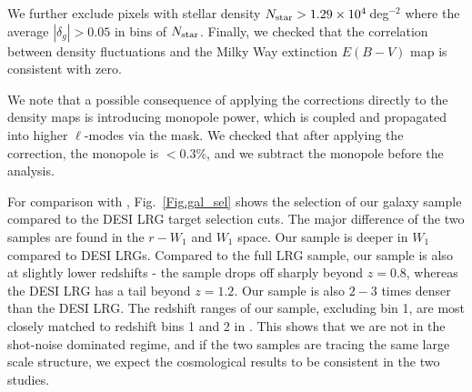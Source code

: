 \documentclass[twocolumn]{aastex631}
\newcommand{\Ellen}[1]{\textcolor{orange}{(QH: #1)}}
\newcommand{\GSF}[1]{\textcolor{green}{(GSF: #1)}}
\begin{document}
{We further exclude pixels with stellar density $N_{\rm star}>1.29\times10^4$\,deg$^{-2}$ where the average $|\delta_g|>0.05$ in bins of $N_{\rm star}$.
Finally, we checked that the correlation between density fluctuations and the Milky Way extinction $E(B-V)$ map \citep{2018JOSS....3..695M} is consistent with zero.


We note that a possible consequence of applying the corrections directly to the density maps is introducing monopole power, which is coupled and propagated into higher $\ell$-modes via the mask. We checked that after applying the correction, the monopole is $< 0.3\%$, and we subtract the monopole before the analysis. 


{For comparison with \cite{Sailer2024}, Fig.~\ref{Fig.gal_sel} shows the selection of our galaxy sample compared to the DESI LRG target selection cuts. The major difference of the two samples are found in the $r-W_1$ and $W_1$ space. Our sample is deeper in $W_1$ compared to DESI LRGs. Compared to the full LRG sample, our sample is also at slightly lower redshifts - the sample drops off sharply beyond $z=0.8$, whereas the DESI LRG has a tail beyond $z=1.2$. Our sample is also $2 - 3$ times denser than the DESI LRG. 
The redshift ranges of our sample, {excluding bin 1,} are most closely matched to redshift bins 1 and 2 in \cite{Sailer2024,Kim2024}.  
This shows that we are not in the shot-noise dominated regime, and if the two samples are tracing the same large scale structure, we expect the cosmological results to be consistent in the two studies.}

}
\end{document}
